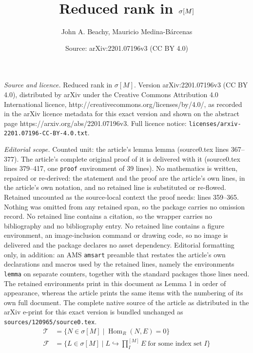 \documentclass[10pt,a4paper]{amsart}
\title{Reduced rank in $\sm$}
\author{John A. Beachy, Mauricio Medina-B\'arcenas}
\date{Source: arXiv:2201.07196v3 (CC BY 4.0)}
\DeclareMathOperator{\Hom}{Hom}
\newcommand{\sm}{\sigma[M]}
\begin{document}
\maketitle

\noindent\emph{Source and licence.} Reduced rank in $\sm$. Version arXiv:2201.07196v3 (CC BY 4.0), distributed by arXiv under the Creative Commons Attribution 4.0 International licence, http://creativecommons.org/licenses/by/4.0/, as recorded in the arXiv licence metadata for this exact version and shown on the abstract page https://arxiv.org/abs/2201.07196v3. Full licence notice: \texttt{licenses/arxiv-2201.07196-CC-BY-4.0.txt}.\par\smallskip

\noindent\textit{Editorial scope.} Counted unit: the article's lemma lemma (source0.tex lines 367--377). The article's complete original proof of it is delivered with it (source0.tex lines 379--417, one \texttt{proof} environment of 39 lines). No mathematics is written, repaired or re-derived: the statement and the proof are the article's own lines, in the article's own notation, and no retained line is substituted or re-flowed.  Retained uncounted as the source-local context the proof needs: lines 359--365.  Nothing was omitted from any retained span, so the package carries no omission record.  No retained line contains a citation, so the wrapper carries no bibliography and no bibliography entry.  No retained line contains a figure environment, an image-inclusion command or drawing code, so no image is delivered and the package declares no asset dependency.  Editorial formatting only, in addition: an AMS \texttt{amsart} preamble that restates the article's own declarations and macros used by the retained lines, namely the environments \texttt{lemma} on separate counters, together with the standard packages those lines need.  The retained environments print in this document as Lemma 1 in order of appearance, whereas the article prints the same items with the numbering of its own full document.  The complete native source of the article as distributed in the arXiv e-print for this exact version is bundled unchanged as \texttt{sources/120965/source0.tex}.
	\begin{equation}\label{11}
		\begin{split}
			\mathcal{T}& =\{N\in\sm\mid \Hom_R(N,E)=0\} \\
			\mathcal{F}& =\{L\in\sm\mid L\hookrightarrow \textstyle{\prod_I^{[M]}E}\;
			\text{for some index set}\;I\}
		\end{split}
	\end{equation}
\end{document}
